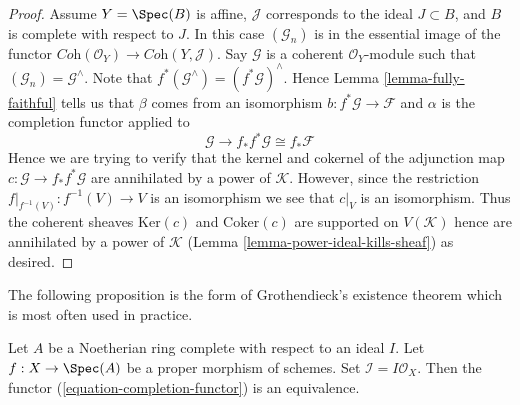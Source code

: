 \begin{proof}
\medskip\noindent
Assume $Y = \Spec(B)$ is affine, $\mathcal{J}$ corresponds to the ideal
$J \subset B$, and $B$ is complete with respect to $J$.
In this case $(\mathcal{G}_n)$ is in the essential image of the functor
$\textit{Coh}(\mathcal{O}_Y) \to \textit{Coh}(Y, \mathcal{J})$.
Say $\mathcal{G}$ is a coherent $\mathcal{O}_Y$-module such that
$(\mathcal{G}_n) = \mathcal{G}^\wedge$. Note that
$f^*(\mathcal{G}^\wedge) = (f^*\mathcal{G})^\wedge$. Hence
Lemma \ref{lemma-fully-faithful}
tells us that $\beta$ comes from an isomorphism
$b : f^*\mathcal{G} \to \mathcal{F}$
and $\alpha$ is the completion functor applied to
$$
\mathcal{G} \to f_*f^*\mathcal{G} \cong f_*\mathcal{F}
$$
Hence we are trying to verify that the kernel and cokernel of the
adjunction map $c : \mathcal{G} \to f_*f^*\mathcal{G}$ are annihilated by
a power of $\mathcal{K}$. However, since the restriction
$f|_{f^{-1}(V)} : f^{-1}(V) \to V$ is an isomorphism
we see that $c|_V$ is an isomorphism. Thus the coherent sheaves
$\text{Ker}(c)$ and $\text{Coker}(c)$ are supported on $V(\mathcal{K})$
hence are annihilated by a power of $\mathcal{K}$
(Lemma \ref{lemma-power-ideal-kills-sheaf}) as desired.
\end{proof}

\noindent
The following proposition is the form of Grothendieck's existence
theorem which is most often used in practice.

\begin{proposition}
\label{proposition-existence-proper}
Let $A$ be a Noetherian ring complete with respect to an ideal $I$.
Let $f : X \to \Spec(A)$ be a proper morphism of schemes.
Set $\mathcal{I} = I\mathcal{O}_X$.
Then the functor (\ref{equation-completion-functor}) is an equivalence.
\end{proposition}


